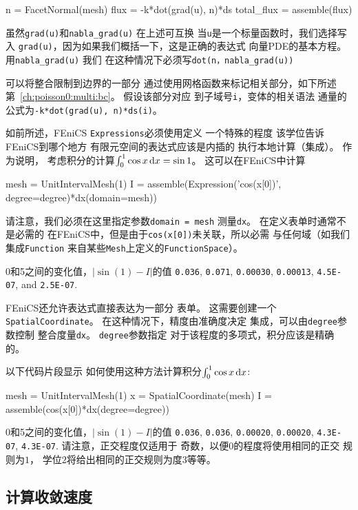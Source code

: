\begin{python}
n = FacetNormal(mesh)
flux = -k*dot(grad(u), n)*ds
total_flux = assemble(flux)
\end{python}
虽然\texttt{grad(u)}和\verb!nabla_grad(u)! 在上述可互换
当\texttt{u}是一个标量函数时，我们选择写入
\texttt{grad(u)}，因为如果我们概括一下，这是正确的表达式
向量PDE的基本方程。 用\verb!nabla_grad(u)! 我们
在这种情况下必须写\verb!dot(n，nabla_grad(u))!

可以将整合限制到边界的一部分
通过使用网格函数来标记相关部分，如下所述
第~\ref{ch:poisson0:multi:bc}。 假设该部分对应
到子域号\texttt{i}，变体的相关语法
通量的公式为\texttt{-k*dot(grad(u), n)*ds(i)}。


\begin{notice}[关于整合准确性的说明]
如前所述，FEniCS \texttt{Expressions}必须使用定义
一个特殊的程度 该学位告诉FEniCS到哪个地方
有限元空间的表达式应该是内插的
执行本地计算（集成）。 作为说明，
考虑积分的计算$\int_0^1 \cos x \dx = \sin
1$。 这可以在FEniCS中计算
\begin{python}
mesh = UnitIntervalMesh(1)
I = assemble(Expression('cos(x[0])', degree=degree)*dx(domain=mesh))
\end{python}
请注意，我们必须在这里指定参数\texttt{domain = mesh}
测量\texttt{dx}。 在定义表单时通常不是必需的
在FEniCS中，但是由于\texttt{cos(x[0])}未关联，所以必需
与任何域（如我们集成\texttt{Function}
来自某些\texttt{Mesh}上定义的\texttt{FunctionSpace}）。

0和5之间的变化值，$|\sin(1) - I|$的值
\texttt{0.036},
\texttt{0.071},
\texttt{0.00030},
\texttt{0.00013},
\texttt{4.5E-07}, and
\texttt{2.5E-07}.

FEniCS还允许表达式直接表达为一部分
表单。 这需要创建一个\texttt{SpatialCoordinate}。
在这种情况下，精度由准确度决定
集成，可以由\texttt{degree}参数控制
整合度量\texttt{dx}。 \texttt{degree}参数指定
对于该程度的多项式，积分应该是精确的。

以下代码片段显示
如何使用这种方法计算积分$\int_0^1 \cos x \dx$:
\begin{python}
mesh = UnitIntervalMesh(1)
x = SpatialCoordinate(mesh)
I = assemble(cos(x[0])*dx(degree=degree))
\end{python}
0和5之间的变化值，$|\sin(1) - I|$的值
\texttt{0.036},
\texttt{0.036},
\texttt{0.00020},
\texttt{0.00020},
\texttt{4.3E-07},
\texttt{4.3E-07}.
请注意，正交程度仅适用于
奇数，以便$0$的程度将使用相同的正交
规则为$1$，
学位$2$将给出相同的正交规则为度$3$等等。
\end{notice}

\subsection{计算收敛速度}
\label{ch:poisson0:convrates}

